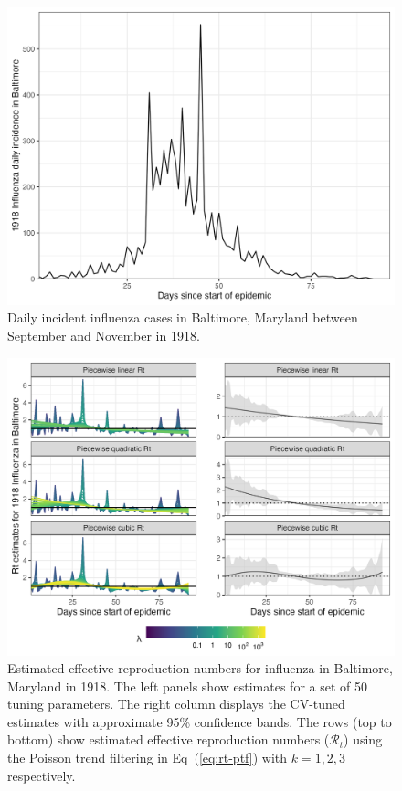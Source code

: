 \documentclass[10pt,letterpaper]{article}
\def\calR{\mathcal{R}}
\renewcommand{\eqref}[1]{Eq~(\ref{#1})}
\begin{document}
\begin{figure}[!ht]
  \centering
  \includegraphics[width=0.8\linewidth]{fig/flu_dat.png}
  \caption{Daily incident influenza cases in Baltimore, Maryland between September 
  and November in 1918.} 
  \label{fig:flu-dat}
\end{figure} 

\begin{figure}[!ht]
  \centering
  \includegraphics[width=0.99\linewidth]{fig/flu_full_res.png}
  \caption{Estimated effective reproduction numbers for influenza in Baltimore,
  Maryland in 1918. The left panels show estimates for a set of 50 tuning
  parameters. The right column displays the CV-tuned estimates with approximate
  95\% confidence bands. The rows (top to bottom) show estimated effective reproduction
  numbers ($\calR_t$) using the Poisson trend filtering in \eqref{eq:rt-ptf}
  with $k=1,2,3$ respectively.} 
  \label{fig:flu-res}
\end{figure} 
\end{document}

